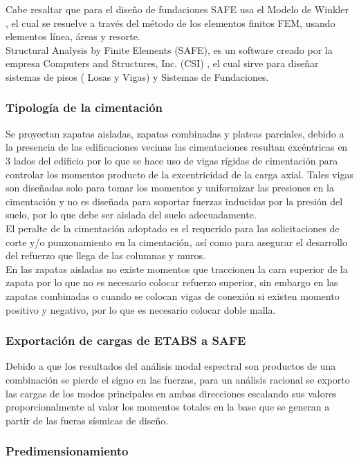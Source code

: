 \documentclass{article}%
\begin{document}
Cabe resaltar que para el diseño de fundaciones SAFE usa el Modelo de Winkler , el cual se resuelve a través del método de los elementos finitos FEM, usando elementos línea, áreas y resorte.\\
Structural Analysis by Finite Elements (SAFE), es un software creado por la empresa Computers and Structures, Inc. (CSI) , el cual sirve para diseñar sistemas de pisos ( Losas y Vigas) y Sistemas de Fundaciones.

\subsubsection{Tipología de la cimentación}
Se proyectan zapatas aisladas, zapatas combinadas y plateas parciales, debido a la presencia de las edificaciones vecinas las cimentaciones resultan excéntricas en 3 lados del edificio por lo que se hace uso de vigas rígidas de cimentación para controlar los momentos producto de la excentricidad de la carga axial. Tales vigas son diseñadas solo para tomar los momentos y uniformizar las presiones en la cimentación y no es diseñada para soportar fuerzas inducidas por la presión del suelo, por lo que debe ser aislada del suelo adecuadamente.\\
El peralte de la cimentación adoptado es el requerido para las solicitaciones de corte y/o punzonamiento en la cimentación, así como para asegurar el desarrollo del refuerzo que llega de las columnas y muros.\\
En las zapatas aisladas no existe momentos que traccionen la cara superior de la zapata por lo que no es necesario colocar refuerzo superior, sin embargo en las zapatas combinadas o cuando se colocan vigas de conexión si existen momento positivo y negativo, por lo que es necesario colocar doble malla.

\subsubsection{Exportación de cargas de ETABS a SAFE}
Debido a que los resultados del análisis modal espectral son productos de una combinación se pierde el signo en las fuerzas, para un análisis racional se exporto las cargas de los modos principales en ambas direcciones escalando sus valores proporcionalmente al valor los momentos totales en la base que se generan a partir de las fueras sísmicas de diseño.

\subsubsection{Predimensionamiento}
\end{document}
